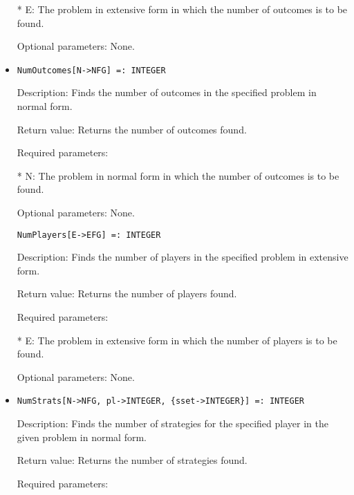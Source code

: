 \begin{itemize}
\bd
\item
[* E:] The problem in extensive form in which the number of outcomes
is to be found.
\ed

\item
[Optional parameters:] None.
\ed

\item
\begin{verbatim}
NumOutcomes[N->NFG] =: INTEGER
\end{verbatim}

\bd
\item
[Description:] Finds the number of outcomes in the specified problem in
normal form.
\item
[Return value:] Returns the number of outcomes found.
\item
[Required parameters:]\hfil\null
	
\bd
\item
[* N:] The problem in normal form in which the number of outcomes is
to be found.
\ed

\item
[Optional parameters:] None.
\ed

\begin{verbatim}
NumPlayers[E->EFG] =: INTEGER
\end{verbatim}

\bd
\item
[Description:] Finds the number of players in the specified problem in
extensive form.
\item
[Return value:] Returns the number of players found.
\item
[Required parameters:]\hfil\null

\bd
\item[* E:] The problem in extensive form in which the number of players
is to be found.
\ed

\item   
[Optional parameters:] None.
\ed

\item
\begin{verbatim}
NumStrats[N->NFG, pl->INTEGER, {sset->INTEGER}] =: INTEGER
\end{verbatim}

\bd

\item
[Description:] Finds the number of strategies for the specified player 
in the given problem in normal form.
\item
[Return value:] Returns the number of strategies found.
\item
[Required parameters:]\hfil\null


\end{itemize}
